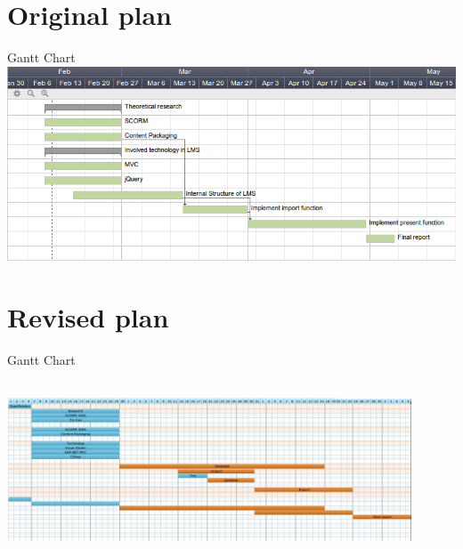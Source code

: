 \documentclass{beamer}
\begin{document}
\section{Original plan}
\begin{frame}{Gantt Chart}
	\includegraphics[scale=0.4]{Ganttold.png}
\end{frame}

\section{Revised plan}
\begin{frame}{Gantt Chart}
	\hspace*{-5mm}
	\includegraphics[width=120mm, height=60mm]{Ganttnew.jpg}
\end{frame}
\end{document}
